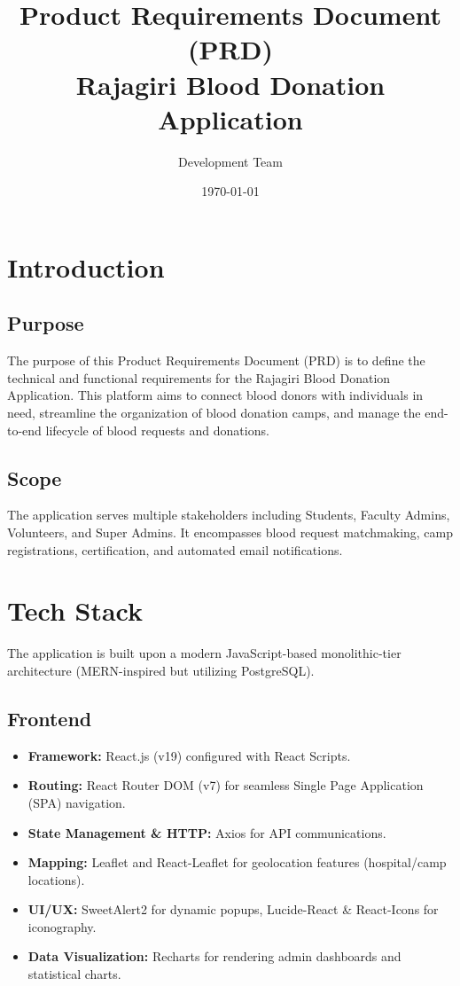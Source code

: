 \documentclass[12pt, a4paper]{article}
\title{\textbf{Product Requirements Document (PRD)}\\
\large Rajagiri Blood Donation Application}
\author{Development Team}
\date{\today}
\begin{document}
\maketitle
\tableofcontents
\newpage

\section{Introduction}
\subsection{Purpose}
The purpose of this Product Requirements Document (PRD) is to define the technical and functional requirements for the Rajagiri Blood Donation Application. This platform aims to connect blood donors with individuals in need, streamline the organization of blood donation camps, and manage the end-to-end lifecycle of blood requests and donations.

\subsection{Scope}
The application serves multiple stakeholders including Students, Faculty Admins, Volunteers, and Super Admins. It encompasses blood request matchmaking, camp registrations, certification, and automated email notifications.

\section{Tech Stack}
The application is built upon a modern JavaScript-based monolithic-tier architecture (MERN-inspired but utilizing PostgreSQL).

\subsection{Frontend}
\begin{itemize}
    \item \textbf{Framework:} React.js (v19) configured with React Scripts.
    \item \textbf{Routing:} React Router DOM (v7) for seamless Single Page Application (SPA) navigation.
    \item \textbf{State Management \& HTTP:} Axios for API communications.
    \item \textbf{Mapping:} Leaflet and React-Leaflet for geolocation features (hospital/camp locations).
    \item \textbf{UI/UX:} SweetAlert2 for dynamic popups, Lucide-React \& React-Icons for iconography.
    \item \textbf{Data Visualization:} Recharts for rendering admin dashboards and statistical charts.
\end{itemize}
\end{document}
